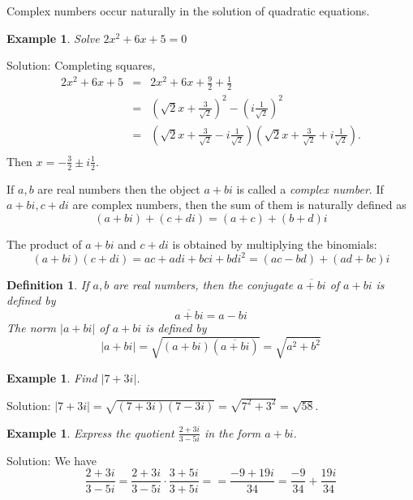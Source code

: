 \documentclass[11pt, openany]{book}
\theoremstyle{change} \theoremheaderfont{\blue\sffamily\bfseries}
\newtheorem{exa}[thm]{Example}
\newtheorem{df}[thm]{Definition}
\theoremstyle{nonumberplain} \theoremheaderfont{\sffamily\bfseries}
\newcommand{\dis}{\displaystyle}
\newcommand{\í}{\'{\i}}
\begin{document}
Complex numbers occur naturally in the solution of quadratic
equations.
\begin{exa} Solve $2x^2 + 6x + 5 = 0$ \end{exa}
Solution: Completing squares,
$$
\begin{array}{lcl}
2x^2 + 6x + 5 & = & 2x^2 + 6x + \frac{9}{2} + \frac{1}{2} \\
& = & (\sqrt{2}x + \frac{{3}}{\sqrt{2}})^2 - (i\frac{1}{\sqrt{2}})^2 \\
& = & (\sqrt{2}x + \frac{{3}}{\sqrt{2}} - i\frac{{1}}{\sqrt{2}})
(\sqrt{2}x + \frac{{3}}{\sqrt{2}} + i\frac{{1}}{\sqrt{2}}). \\
\end{array}$$
Then  $x = -\frac{3}{{2}} \pm i\frac{1}{{2}}$.

If $a, b$ are real numbers then the object $a + bi$ is called a
{\em complex number}. If $a + bi, c + di$ are complex numbers,
then the sum of them is naturally defined as
\begin{equation} (a + bi) + (c + di) = (a + c) + (b + d)i \end{equation}



The product of $a + bi$ and $c + di$ is obtained by multiplying
the binomials:
\begin{equation}
(a + bi)(c + di) = ac + adi + bci + bdi^2 = (ac - bd) + (ad + bc)i
\end{equation}

\begin{df}
If $a, b$ are real numbers, then the {\em conjugate} $\overline{a
+ bi}$ of  $a + bi$ is defined by
\begin{equation}
\overline{a + bi} = a - bi
\end{equation} The {\em norm} $|a + bi|$ of $a + bi$ is
defined by
\begin{equation}
|a + bi| = \sqrt{(a + bi)(\overline{a + bi})} = \sqrt{a^2 + b^2}
\end{equation}
\end{df}



\begin{exa}
Find $|7 + 3i|$.
\end{exa}
Solution: $|7 + 3i| = \sqrt{(7 + 3i)(7 - 3i)} = \sqrt{7^2 + 3^2} =
\sqrt{58}$.
\begin{exa}
Express the quotient $\dis{\frac{2 + 3i}{3 - 5i}}$ in the form $a
+ bi$.
\end{exa}
Solution: We have
$$
\frac{2 + 3i}{3 - 5i} = \frac{2 + 3i}{3 - 5i}\cdot \frac{3 + 5i}{3
+ 5i} = = \frac{-9 + 19i}{34} = \frac{-9}{34} + \frac{19i}{34}$$
\end{document}
